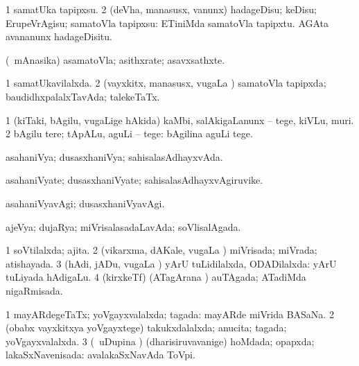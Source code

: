 \bentry
{} 
\gl{\sakirx}
\expl{}
\bmng
\bnum
\num{1} samatUka tapipxsu. 
\num{2} (deVha, manasusx, \mo vanunx) hadageDisu; keDisu; ErupeVrAgisu; samatoVla tapipxsu:  ETiniMda samatoVla tapipxtu.  AGAta avananunx hadageDisitu. 
\enum
\emng
\eentry

\bentry
{} 
\gl{\nA}
\expl{}
\bmng
(\kanmu\ mAnasika) asamatoVla; asithxrate; asavxsathxte. 
\emng
\eentry

\bentry
{} 
\gl{\gu}
\expl{}
\bmng
\bnum
\num{1} samatUkavilalxda. 
\num{2} (vayxkitx, manasusx, \mo vugaLa \vi) samatoVla tapipxda; baudidhxpalalxTavAda; talekeTaTx. 
\enum
\emng
\eentry

\bentry
{} 
\gl{\sakirx}
\bmng
\bnum
\num{1} (kiTaki, bAgilu, \mo vugaLige hAkida) kaMbi, salAkigaLanunx -- tege, kiVLu, muri. 
\num{2} bAgilu tere; tApALu, aguLi -- tege:  bAgilina aguLi tege. 
\enum
\emng
\eentry

\bentry
{} 
\gl{\gu}
\expl{}
\bmng
asahaniVya; dusasxhaniVya; sahisalasAdhayxvAda. 
\emng
\eentry

\bentry
{} 
\gl{\nA}
\expl{}
\bmng
asahaniVyate; dusasxhaniVyate; sahisalasAdhayxvAgiruvike. 
\emng
\eentry

\bentry
{} 
\gl{\kirxvi}
\expl{}
\bmng
asahaniVyavAgi; dusasxhaniVyavAgi. 
\emng
\eentry

\bentry
{} 
\gl{\gu}
\expl{}
\bmng
ajeVya; dujaRya; miVrisalasadaLavAda; soVlisalAgada. 
\emng
\eentry

\bentry
{} 
\gl{\gu}
\expl{}
\bmng
\bnum
\num{1} soVtilalxda; ajita. 
\num{2} (vikarxma, dAKale, \mo vugaLa \vi) miVrisada; miVrada; atishayada. 
\num{3} (hAdi, jADu, \mo vugaLa \vi) yArU tuLidilalxda, ODADilalxda:  yArU tuLiyada hAdigaLu. 
\num{4} (kirxkeTf) (ATagArana \vi) auTAgada; ATadiMda nigaRmisada. 
\enum
\emng
\eentry

\bentry
{} 
\gl{\gu}
\expl{}
\bmng
\bnum
\num{1} mayARdegeTaTx; yoVgayxvalalxda; tagada:  mayARde miVrida BASaNa. 
\num{2} (obabx vayxkitxya yoVgayxtege) takukxdalalxda; anucita; tagada; yoVgayxvalalxda. 
\num{3} (\kanmu\ uDupina \vi) (dharisiruvavanige) hoMdada; opapxda; lakaSxNavenisada:  avalakaSxNavAda ToVpi. 
\enum
\emng
\eentry

